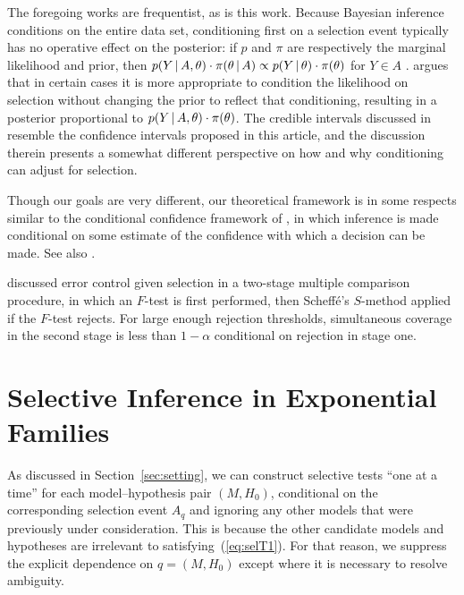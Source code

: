\documentclass{article}
\theoremstyle{definition}
\begin{document}
The foregoing works are frequentist, as is this work. Because Bayesian inference conditions on the entire data set, conditioning first on a selection event typically has no operative effect on the posterior: if $p$ and $\pi$ are respectively the marginal likelihood and prior, then $p(Y \,|\, A, \theta)\cdot \pi(\theta \,|\, A) \propto p(Y \,|\, \theta)\cdot \pi(\theta)$ for $Y\in A$  \citep{dawid1994selection}. \citet{yekutieli2012adjusted} argues that in certain cases it is more appropriate to condition the likelihood on selection without changing the prior to reflect that conditioning, resulting in a posterior proportional to $p(Y \,|\, A, \theta)\cdot \pi(\theta)$. The credible intervals discussed in \citet{yekutieli2012adjusted} resemble the confidence intervals proposed in this article, and the discussion therein presents a somewhat different perspective on how and why conditioning can adjust for selection.



Though our goals are very different, our theoretical framework is in some respects similar to the conditional confidence framework of \citet{kiefer1976admissibility}, in which inference is made conditional on some estimate of the confidence with which a decision can be made. See also \citet{kiefer1977conditional, brownie1977ideas,brown1978contribution,berger1994unified}.

\citet{olshen1973conditional} discussed error control given selection in a two-stage multiple comparison procedure, in which an $F$-test is first performed, then Scheff\'{e}'s $S$-method applied if the $F$-test rejects. For large enough rejection thresholds, simultaneous coverage in the second stage is less than $1-\alpha$ conditional on rejection in stage one.



\section{Selective Inference in Exponential Families}\label{sec:exfam}

As discussed in Section~\ref{sec:setting}, we can construct selective tests ``one at a time'' for each model--hypothesis pair $(M, H_0)$, conditional on the corresponding selection event $A_q$ and ignoring any other models that were previously under consideration. This is because the other candidate models and hypotheses are irrelevant to satisfying~(\ref{eq:selT1}). For that reason, we suppress the explicit dependence on $q=(M,H_0)$ except where it is necessary to resolve ambiguity.
\end{document}
